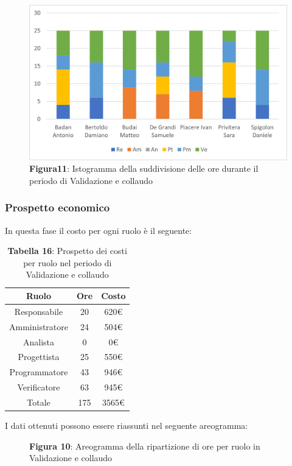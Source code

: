 \begin{figure}[H]
	\centering
	\includegraphics[width=0.7\linewidth]{res/images/Figura11.png}
	\caption*{\textbf{Figura11}: Istogramma della suddivisione delle ore durante il periodo di Validazione e collaudo}
	\label{fig:Figura10}
\end{figure}
	
	
\subsubsection{Prospetto economico}
In questa fase il costo per ogni ruolo è il seguente:

\begin{table}[H]
	\centering
	\renewcommand{\arraystretch}{1.5}
	\begin{tabular}{|c|c|c|}
		\hline
		\rowcolor{lighter-grayer}
		Ruolo & Ore & Costo \\
		\hline
		Responsabile & 20 & 620\euro \\
		\hline
		Amministratore & 24 & 504\euro \\
		\hline
		Analista & 0 & 0\euro \\
		\hline
		Progettista & 25 & 550\euro \\
		\hline
		Programmatore & 43 & 946\euro \\
		\hline
		Verificatore & 63 & 945\euro \\
		\hline
		Totale & 175 &  3565\euro \\
		\hline
	\end{tabular}
\caption*{\textbf{Tabella 16}: Prospetto dei costi per ruolo nel periodo di Validazione e collaudo\\}
\end{table}

I dati ottenuti possono essere riassunti nel seguente areogramma:


\begin{figure}[!h]
	\centering
	\caption*{\textbf{Figura 10}: Areogramma della ripartizione di ore per ruolo in Validazione e collaudo}
	\label{fig:Figura10}
\end{figure}

